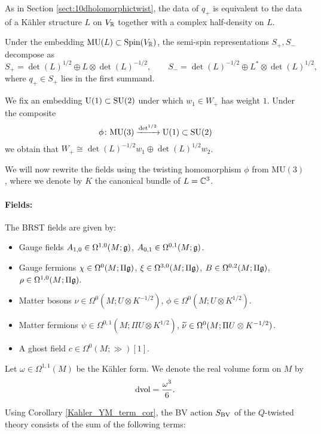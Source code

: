 \documentclass[10pt, oneside]{article}
\newcommand{\MU}{\mathrm{MU}}
\renewcommand{\U}{\mathrm{U}}
\begin{document}
As in Section \ref{sect:10dholomorphictwist}, the data of $q_+$ is equivalent to the data of a K\"ahler structure $L$ on $V_\mathbb R$ together with a complex half-density on $L$.

Under the embedding $\MU(L)\subset \Spin(V_\RR)$, the semi-spin representations $S_+, S_-$ decompose as
\[S_+ = \det(L)^{1/2}\oplus L\otimes \det(L)^{-1/2},\qquad S_- = \det(L)^{-1/2} \oplus L^*\otimes \det(L)^{1/2},\]
where $q_+\in S_+$ lies in the first summand.

We fix an embedding $\U(1)\subset \SU(2)$ under which $w_1\in W_+$ has weight $1$. Under the composite
\[\phi\colon\MU(3)\xrightarrow{\det^{1/2}}\U(1)\subset \SU(2)\]
we obtain that $W_+\cong \det(L)^{-1/2} w_1\oplus \det(L)^{1/2} w_2$.

We will now rewrite the fields using the twisting homomorphism $\phi$ from $\MU(3)$, where we denote by $K$ the canonical bundle of $L=\mathbb C^3$.

\vspace{-10pt}
\paragraph{Fields:} The BRST fields are given by:
\begin{itemize}
\item Gauge fields $A_{1, 0} \in \Omega^{1, 0}(M; \mathfrak g)$, $A_{0, 1}\in\Omega^{0, 1}(M; \mathfrak g)$.
\item Gauge fermions $\chi\in\Omega^0(M; \Pi\mathfrak g)$, $\xi\in\Omega^{3, 0}(M; \Pi\mathfrak g)$, $B\in\Omega^{0, 2}(M; \Pi\mathfrak g)$, $\rho\in\Omega^{1, 0}(M; \Pi\mathfrak g)$.
\item Matter bosons $\nu\in\Omega^0(M; U\otimes K^{-1/2})$, $\phi\in\Omega^0(M; U\otimes K^{1/2})$.
\item Matter fermions $\psi\in \Omega^{0, 1}(M; \Pi U\otimes K^{1/2})$, $\widetilde{\nu}\in\Omega^0(M; \Pi U\otimes K^{-1/2})$.
\item A ghost field $c\in \Omega^0(M; \gg)[1]$.
\end{itemize}

Let $\omega\in\Omega^{1, 1}(M)$ be the K\"ahler form. We denote the real volume form on $M$ by
\[\operatorname{dvol} = \frac{\omega^3}{6}.\]

Using Corollary \ref{Kahler_YM_term_cor}, the BV action $S_{\mathrm{BV}}$ of the $Q$-twisted theory consists of the sum of the following terms:
\end{document}

